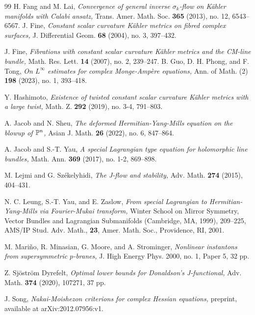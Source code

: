 \documentclass{amsart}
\numberwithin{equation}{section}
\theoremstyle{plain}
\theoremstyle{definition}
\theoremstyle{remark}
\begin{document}
\begin{thebibliography}{99}
  H. Fang and M. Lai, \textit{Convergence of general inverse $\sigma_k$-flow on Kähler manifolds with Calabi ansatz,} 
  Trans. Amer. Math. Soc. \textbf{365} (2013), no. 12, 6543--6567.
  J. Fine,
  \textit{Constant scalar curvature K{\"a}hler metrics on fibred complex surfaces,}
  J. Differential Geom. \textbf{68} (2004), no. 3, 397--432.
  
  J. Fine, \textit{Fibrations with constant scalar curvature Kähler metrics and the CM-line bundle,} 
  Math. Res. Lett. \textbf{14} (2007), no. 2, 239--247.
  B. Guo, D. H. Phong, and F. Tong, 
  \textit{On $L^\infty$ estimates for complex Monge-Ampère equations,} Ann. of Math. (2) \textbf{198} (2023), no. 1, 393--418.
 
  Y. Hashimoto,
  \textit{Existence of twisted constant scalar curvature K{\"a}hler metrics with a large twist,}
  Math. Z. \textbf{292} (2019), no. 3-4, 791--803.
  
  A. Jacob and N. Sheu, 
  \textit{The deformed Hermitian-Yang-Mills equation on the blowup of $\Bbb P^n$,} 
  Asian J. Math. \textbf{26} (2022), no. 6, 847--864.
 
  A. Jacob and S.-T. Yau, 
  \textit{A special Lagrangian type equation for holomorphic line bundles,} Math. Ann. \textbf{369} (2017), no. 1-2, 869--898.
 
  M. Lejmi and G. Sz{\'e}kelyhidi,
  \textit{The J-flow and stability,}
  Adv. Math. \textbf{274} (2015), 404–431.
 
  N. C. Leung, S.-T. Yau, and E. Zaslow, 
  \textit{From special Lagrangian to Hermitian-Yang-Mills via Fourier-Mukai transform,} 
  Winter School on Mirror Symmetry, Vector Bundles and Lagrangian Submanifolds (Cambridge, MA, 1999), 209--225, AMS/IP Stud. Adv. Math., \textbf{23}, Amer. Math. Soc., Providence, RI, 2001.
 
  M. Mariño, R. Minasian, G. Moore, and A. Strominger, 
  \textit{Nonlinear instantons from supersymmetric $p$-branes,} 
  J. High Energy Phys. 2000, no. 1, Paper 5, 32 pp.
  
  Z. Sjöström Dyrefelt, \textit{Optimal lower bounds for Donaldson's J-functional,} Adv. Math. \textbf{374} (2020), 107271, 37 pp.
 
  J. Song,
  \textit{Nakai-Moishezon criterions for complex Hessian equations,}
  preprint, available at arXiv:2012.07956:v1.


\end{thebibliography}
\end{document}
